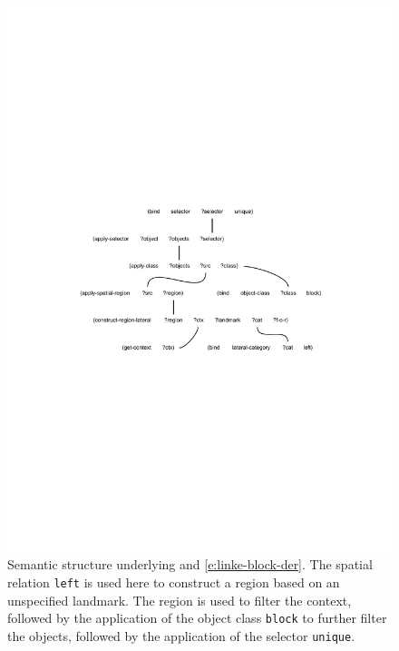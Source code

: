 \begin{figure}
\begin{center}
\includegraphics[width=1.0\columnwidth]{figs/semantic-structure-der-block-links}
\end{center}
\caption[Semantic structure example lateral region without landmark]{Semantic structure underlying 
 and \ref{e:linke-block-der}. 
The spatial relation {\footnotesize\tt left} is used here to construct a
region based on an unspecified landmark. The region is used to filter the context,
followed by the application of the object class {\footnotesize\tt block} to further filter the objects,
followed by the application of the selector {\footnotesize\tt unique}.}
\label{f:semantic-structure-3}
\label{f:semantic-structure}
\end{figure}


